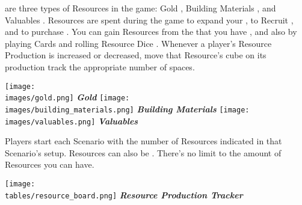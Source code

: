 
\begin{multicols}{2}

 are three types of Resources in the game: Gold , Building Materials , and Valuables .
Resources are spent during the game to expand your , to Recruit , and to purchase .
You can gain Resources from the  that you have , and also by playing Cards and rolling Resource Dice .
Whenever a player's Resource Production is increased or decreased, move that Resource's cube on its production track the appropriate number of spaces.\par
\begin{multicols}{3}
  \centering
  \vspace*{\fill}
  \texttt{[image: \\images/gold.png]}
  \footnotesize\textcolor{darkcandyapplered}{\textit{\textbf{Gold \phantom{Materials}}}}
  \columnbreak
  \vspace*{\fill}
  \texttt{[image: \\images/building\_materials.png]}
  \footnotesize\textcolor{darkcandyapplered}{\textit{\textbf{Building Materials}}}
  \columnbreak
  \vspace*{\fill}
  \texttt{[image: \\images/valuables.png]}
  \footnotesize\textcolor{darkcandyapplered}{\textit{\textbf{Valuables \phantom{Materials}}}}
\end{multicols}
Players start each Scenario with the number of Resources indicated in that Scenario’s setup.
Resources can also be .
There's no limit to the amount of Resources you can have.

\vspace*{\fill}

\columnbreak

\begin{center}
  \texttt{[image: \\tables/resource\_board.png]}
  \footnotesize\textcolor{darkcandyapplered}{\textbf{\textit{Resource Production Tracker}}}
\end{center}
\bigskip


\end{multicols}

